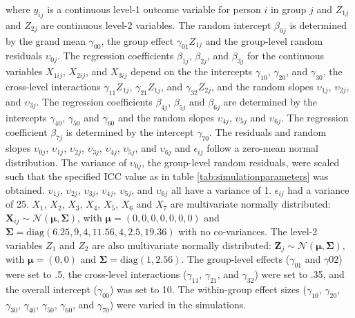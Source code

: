 \documentclass[10pt, a4paper, titlepage]{article}
\begin{document}
\begin{subequations}
\end{subequations} where $y_{ij}$ is a continuous level-1 outcome variable for person $i$ in group $j$ and $Z_{1j}$ and $Z_{2j}$ are continuous level-2 variables. The random intercept $\beta_{0j}$ is determined by the grand mean $\gamma_{00}$, the group effect $\gamma_{01}Z_{1j}$ and the group-level random residuals $\upsilon_{0j}$. The regression coefficients $\beta_{1j}$, $\beta_{2j}$, and $\beta_{3j}$ for the continuous variables $X_{1ij}$, $X_{2ij}$, and $X_{3ij}$ depend on the the intercepts $\gamma_{10}$, $\gamma_{20}$, and $\gamma_{30}$, the cross-level interactions $\gamma_{11}Z_{1j}$, $\gamma_{21}Z_{1j}$, and $\gamma_{32}Z_{2j}$, and the random slopes $\upsilon_{1j}$, $\upsilon_{2j}$, and $\upsilon_{3j}$. The regression coefficients $\beta_{4j}$, $\beta_{5j}$ and $\beta_{6j}$ are determined by the intercepts $\gamma_{40}$, $\gamma_{50}$ and $\gamma_{60}$ and the random slopes $\upsilon_{4j}$, $\upsilon_{5j}$ and $\upsilon_{6j}$. The regression coefficient $\beta_{7j}$ is determined by the intercept $\gamma_{70}$. The residuals and random slopes $\upsilon_{0j}$, $\upsilon_{1j}$, $\upsilon_{2j}$, $\upsilon_{3j}$, $\upsilon_{4j}$, $\upsilon_{5j}$, and $\upsilon_{6j}$ and $\epsilon_{ij}$ follow a zero-mean normal distribution. The variance of $\upsilon_{0j}$, the group-level random residuals, were scaled such that the specified ICC value as in table \ref{tab:simulationparameters} was obtained. $\upsilon_{1j}$, $\upsilon_{2j}$, $\upsilon_{3j}$, $\upsilon_{4j}$, $\upsilon_{5j}$, and $\upsilon_{6j}$ all have a variance of 1. $\epsilon_{ij}$ had a variance of 25. $X_1$, $X_2$, $X_3$, $X_4$, $X_5$, $X_6$ and $X_7$ are multivariate normally distributed: $\mathbf{X}_{ij} \sim \mathcal{N}(\boldsymbol{\mu}, \boldsymbol{\Sigma})$, with $\boldsymbol{\mu} = (0, 0, 0, 0, 0, 0, 0)$ and $\boldsymbol{\Sigma} = \text{diag}(6.25, 9, 4, 11.56, 4, 2.5, 19.36)$ with no co-variances. The level-2 variables $Z_1$ and $Z_2$ are also multivariate normally distributed:  $\mathbf{Z}_{j} \sim \mathcal{N}(\boldsymbol{\mu}, \boldsymbol{\Sigma})$, with $\boldsymbol{\mu} = (0, 0)$ and $\boldsymbol{\Sigma} = \text{diag}(1, 2.56)$. The group-level effects ($\gamma_{01}$ and $\gamma{02}$) were set to .5, the cross-level interactions ($\gamma_{11}$, $\gamma_{21}$, and $\gamma_{32}$) were set to .35, and the overall intercept ($\gamma_{00}$) was set to 10. The within-group effect sizes ($\gamma_{10}$, $\gamma_{20}$, $\gamma_{30}$, $\gamma_{40}$, $\gamma_{50}$, $\gamma_{60}$, and $\gamma_{70}$) were varied in the simulations.
\end{document}
